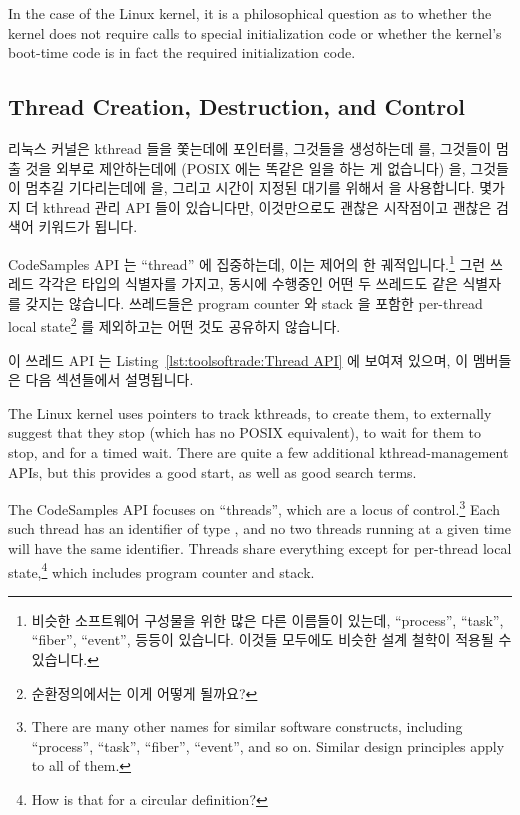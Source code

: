 In the case of the Linux kernel, it is a philosophical question as to
whether the kernel does not require calls to special initialization
code or whether the kernel's boot-time code is in fact the required
initialization code.
\fi

\subsection{Thread Creation, Destruction, and Control}
\label{sec:toolsoftrade:Thread Creation, Destruction, and Control}

리눅스 커널은 kthread 들을 쫓는데에  포인터를, 그것들을
생성하는데  를, 그것들이 멈출 것을 외부로 제안하는데에
(POSIX 에는 똑같은 일을 하는 게 없습니다)  을,
그것들이 멈추길 기다리는데에  을, 그리고 시간이 지정된
대기를 위해서  을 사용합니다.
몇가지 더 kthread 관리 API 들이 있습니다만, 이것만으로도 괜찮은 시작점이고
괜찮은 검색어 키워드가 됩니다.

CodeSamples API 는 ``thread'' 에 집중하는데, 이는 제어의 한
궤적입니다.\footnote{
	비슷한 소프트웨어 구성물을 위한 많은 다른 이름들이 있는데, ``process'',
	``task'', ``fiber'', ``event'', 등등이 있습니다.
	이것들 모두에도 비슷한 설계 철학이 적용될 수 있습니다.}
그런 쓰레드 각각은  타입의 식별자를 가지고, 동시에 수행중인
어떤 두 쓰레드도 같은 식별자를 갖지는 않습니다.
쓰레드들은 program counter 와 stack 을 포함한 per-thread local state\footnote{
	순환정의에서는 이게 어떻게 될까요?}
를 제외하고는 어떤 것도 공유하지 않습니다.

이 쓰레드 API 는
Listing~\ref{lst:toolsoftrade:Thread API} 에 보여져 있으며, 이 멤버들은 다음
섹션들에서 설명됩니다.
\iffalse

The Linux kernel uses
 pointers to track kthreads,
 to create them,
 to externally suggest that they stop
(which has no POSIX equivalent),
 to wait for them to stop, and
 for a timed wait.
There are quite a few additional kthread-management APIs, but this
provides a good start, as well as good search terms.

The CodeSamples API focuses on ``threads'', which are a locus of
control.\footnote{
	There are many other names for similar software constructs, including
	``process'', ``task'', ``fiber'', ``event'', and so on.
	Similar design principles apply to all of them.}
Each such thread has an identifier of type ,
and no two threads running at a given time will have the same
identifier.
Threads share everything except for per-thread local state,\footnote{
	How is that for a circular definition?}
which includes program counter and stack.

